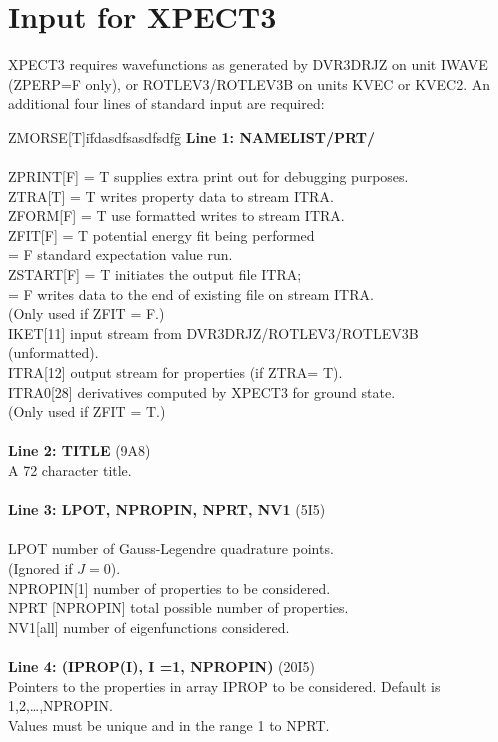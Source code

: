 \documentclass{elsart}
\begin{document}
\section{Input for XPECT3}

XPECT3 requires wavefunctions as generated by DVR3DRJZ on unit IWAVE
(ZPERP=F only), or ROTLEV3/ROTLEV3B on units KVEC or KVEC2. An additional
four lines of standard input are required:

\vskip 0.2cm
\begin{tabbing}
ZMORSE[T]i\=    fdasdfsasdfsdfg\=   \=             \kill
{\bf Line 1: NAMELIST/PRT/}\\
\\
ZPRINT[F] \> = T supplies extra print out for debugging purposes.\\
ZTRA[T] \> = T writes property data to stream ITRA.\\
ZFORM[F] \> = T use formatted writes to stream ITRA.\\
ZFIT[F] \> = T potential energy fit being performed\\
\> = F standard expectation value run.\\
ZSTART[F] \> = T initiates the output file ITRA;\\
    \> = F writes data to the end of existing file on stream ITRA.\\
    \> (Only used if ZFIT = F.)\\
IKET[11] \> input stream from DVR3DRJZ/ROTLEV3/ROTLEV3B (unformatted).\\
ITRA[12] \>  output stream for properties (if ZTRA= T).\\
ITRA0[28] \> derivatives computed by XPECT3 for ground state.\\
 \> (Only used if ZFIT = T.)\\
\\
{\bf Line 2: TITLE} (9A8)\\
A 72 character title.\\
\\
{\bf Line 3: LPOT, NPROPIN, NPRT, NV1} (5I5)\\
\\
LPOT \> number of Gauss-Legendre quadrature points.\\
\> (Ignored if $J=0$).\\
NPROPIN[1]\> number of properties to be considered.\\
NPRT [NPROPIN] total possible number of properties.\\
NV1[all] \> number of eigenfunctions considered.\\
\\
{\bf Line 4: (IPROP(I), I =1, NPROPIN)} (20I5) \\
Pointers to the properties in array IPROP to be considered.
Default is 1,2,\dots,NPROPIN. \\
Values must be unique and in the range 1 to NPRT.\\
\end{tabbing}
\end{document}
